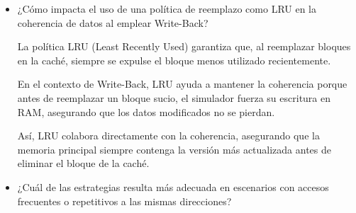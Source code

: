 \documentclass{article}
\begin{document}
\begin{itemize}
\begin{itemize}
\begin{itemize}
                {En cambio, en Write-Through, cada vez que se escribe un dato, la operación se envía simultáneamente a la RAM, generando más tráfico y mayor tiempo por acceso, ya que la RAM es más lenta que la caché.}

                \quad
                
                \item Write-Through ofrece mejor coherencia.

                \quad

                {Write-Through actualiza la RAM al mismo tiempo que la caché. Por tanto, los datos en ambas memorias siempre están sincronizados, eliminando el riesgo de que la caché contenga información diferente a la memoria principal.}

                \quad
                
                {En cambio, Write-Back retrasar la actualización hasta que se reemplace un bloque sucio, lo cual puede provocar incoherencias temporales entre caché y RAM (aunque el sistema lo controla mediante la marca dirty).}
                
            \end{itemize}

        \quad
        
        \item ¿Cómo impacta el uso de una política de reemplazo como LRU en la coherencia de datos al emplear Write-Back?
        
        \quad

        {La política LRU (Least Recently Used) garantiza que, al reemplazar bloques en la caché, siempre se expulse el bloque menos utilizado recientemente.}
        
        \quad
        
        {En el contexto de Write-Back, LRU ayuda a mantener la coherencia porque antes de reemplazar un bloque sucio, el simulador fuerza su escritura en RAM, asegurando que los datos modificados no se pierdan.}
        
        \quad
        
        {Así, LRU colabora directamente con la coherencia, asegurando que la memoria principal siempre contenga la versión más actualizada antes de eliminar el bloque de la caché.}

        \quad
        
        \item ¿Cuál de las estrategias resulta más adecuada en escenarios con accesos frecuentes o repetitivos a las mismas direcciones?


\end{itemize}
\end{itemize}
\end{document}
